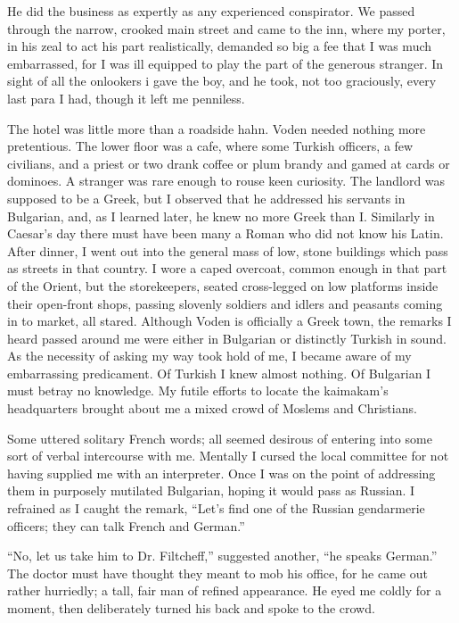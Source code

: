 \documentclass[a5paper,12pt]{book}
\begin{document}
He did the business as expertly as any experienced conspirator. We passed through the narrow, crooked main street and came to the inn, where my porter, in his zeal to act his part realistically, demanded so big a fee that I was much embarrassed, for I was ill equipped to play the part of the generous stranger. In sight of all the onlookers i gave the boy, and he took, not too graciously, every last para I had, though it left me penniless.

The hotel was little more than a roadside hahn. Voden needed nothing more pretentious. The lower floor was a cafe, where some Turkish officers, a few civilians, and a priest or two drank coffee or plum brandy and gamed at cards or dominoes. A stranger was rare enough to rouse keen curiosity. The landlord was supposed to be a Greek, but I observed that he addressed his servants in Bulgarian, and, as I learned later, he knew no more Greek than I. Similarly in Caesar's day there must have been many a Roman who did not know his Latin.
After dinner, I went out into the general mass of low, stone buildings which pass as streets in that country. I wore a caped overcoat, common enough in that part of the Orient, but the storekeepers, seated cross-legged on low platforms inside their open-front shops, passing slovenly soldiers and idlers and peasants coming in to market, all stared. Although Voden is officially a Greek town, the remarks I heard passed around me were either in Bulgarian or distinctly Turkish in sound. As the necessity of asking my way took hold of me, I became aware of my embarrassing predicament. Of Turkish I knew almost nothing. Of Bulgarian I must betray no knowledge. My futile efforts to locate the kaimakam’s headquarters brought about me a mixed crowd of Moslems and Christians. 

Some uttered solitary French words; all seemed desirous of entering into some sort of verbal intercourse with me. Mentally I cursed the local committee for not having supplied me with an interpreter. Once I was on the point of addressing them in purposely mutilated Bulgarian, hoping it would pass as Russian. I refrained as I caught the remark, “Let’s find one of the Russian gendarmerie officers; they can talk French and German.” 

“No, let us take him to Dr. Filtcheff,” suggested another, “he speaks German.” The doctor must have thought they meant to mob his office, for he came out rather hurriedly; a tall, fair man of refined appearance. He eyed me coldly for a moment, then deliberately turned his back and spoke to the crowd. 
\end{document}
